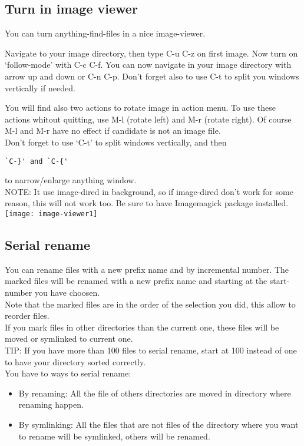 \documentclass[a4paper,11pt]{article}
\begin{document}
\subsection{Turn in image viewer}
\label{sec:turn-image-viewer}
You can turn anything-find-files in a nice image-viewer.

Navigate to your image directory, then type C-u C-z on first image.
Now turn on `follow-mode' with C-c C-f.
You can now navigate in your image directory with arrow up and down or C-n C-p.
Don't forget also to use C-t to split you windows vertically if needed.

You will find also two actions to rotate image in action menu. 
To use these actions whitout quitting, use M-l (rotate left) and M-r (rotate right).
Of course M-l and M-r have no effect if candidate is not an image file.\\

Don't forget to use `C-t' to split windows vertically, and then
\begin{verbatim}
`C-}' and `C-{'
\end{verbatim}
to narrow/enlarge anything window.\\

NOTE:
It use image-dired in background, so if image-dired don't work for some reason, this will
not work too.
Be sure to have Imagemagick package installed.\\

\texttt{[image: image-viewer1]}
\newpage

\subsection{Serial rename}
\label{sec:serial-rename}
You can rename files with a new prefix name and by incremental number.
The marked files will be renamed with a new prefix name and starting
at the start-number you have choosen.\\
Note that the marked files are in the order of the selection you did, this allow to reorder
files.\\
If you mark files in other directories than the current one, these files will be moved or symlinked to current one.\\

TIP: If you have more than 100 files to serial rename, start at 100 instead of one to have your directory
sorted correctly.\\

You have to ways to serial rename:\\
\begin{itemize}
\item By renaming: All the file of others directories are moved in directory where renaming happen.\\ 
\end{itemize}
\begin{itemize}
\item By symlinking: All the files that are not files of the directory where you want to rename will be symlinked,
others will be renamed.\\
\end{itemize}
\end{document}

